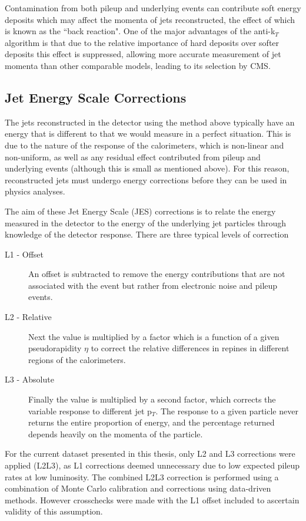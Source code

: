 Contamination from both pileup and underlying events can contribute soft energy deposits which may affect the momenta of jets reconstructed, the effect of which is known as the ``back reaction". One of the major advantages of the anti-k$_{T}$ algorithm is that due to the relative importance of hard deposits over softer deposits this effect is suppressed, allowing more accurate measurement of jet momenta than other comparable models, leading to its selection by CMS.
\subsection{Jet Energy Scale Corrections}
\label{sec:JES}
The jets reconstructed in the detector using the method above typically have an energy that is different to that we would measure in a perfect situation. This is due to the nature of the response of the calorimeters, which is non-linear and non-uniform, as well as any residual effect contributed from pileup and underlying events (although this is small as mentioned above). For this reason, reconstructed jets must undergo energy corrections before they can be used in physics analyses. 

The aim of these Jet Energy Scale (JES) corrections is to relate the energy measured in the detector to the energy of the underlying jet particles through knowledge of the detector response. There are three typical levels of correction 

\begin{description}
\item[L1 - Offset]{An offset is subtracted to remove the energy contributions that are not associated with the event but rather from electronic noise and pileup events.  }
\item[L2 - Relative]{Next the value is multiplied by a factor which is a function of a given pseudorapidity $\eta$ to correct the relative differences in repines in different regions of the calorimeters.}
\item [L3 - Absolute]{Finally the value is multiplied by a second factor, which corrects the variable response to different jet p$_{T}$. The response to a given particle never returns the entire proportion of energy, and the percentage returned depends heavily on the momenta of the particle.}
\end{description}

For the current dataset presented in this thesis, only L2 and L3 corrections were applied (L2L3), as L1 corrections deemed unnecessary due to low expected pileup rates at low luminosity. The combined L2L3 correction is performed using a combination of Monte Carlo calibration and corrections using data-driven methods. However crosschecks were made with the L1 offset included to ascertain validity of this assumption.

